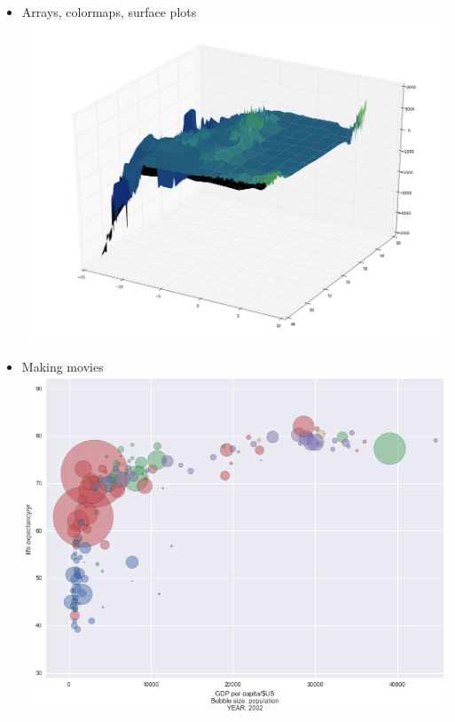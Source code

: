 \begin{frame}
\begin{scriptsize}
\begin{columns}[T]
\begin{column}{5.5cm}
\begin{itemize}
        \item Arrays, colormaps, surface plots\\
          \includegraphics[height=0.15\textheight]{images/ex4}          
        \item Making movies\\
          \includegraphics[height=0.15\textheight]{images/ex6}
      \end{itemize}
    \end{column}
  \end{columns}   
  \end{scriptsize}   
\end{frame}

